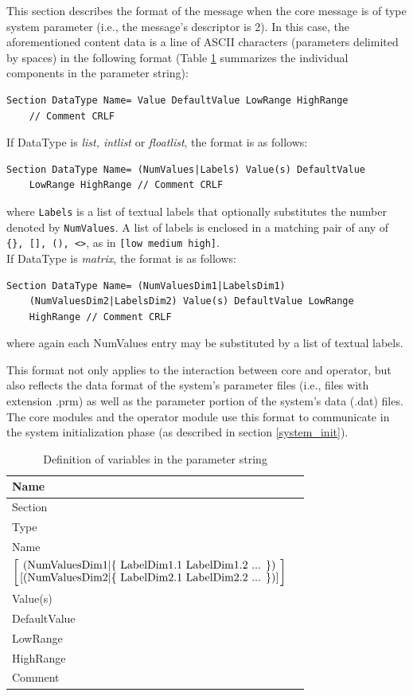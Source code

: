 \documentclass[letterpaper,oneside,12pt]{book}
\begin{document}
This section describes the format of the message when the core message is of 
type system parameter (i.e., the message's descriptor is 2). In this case, the 
aforementioned content data is a line of ASCII characters (parameters delimited 
by spaces) in the following format (Table \ref{tab:parametervariables} summarizes
the individual components in the parameter string):
\begin{verbatim}
Section DataType Name= Value DefaultValue LowRange HighRange
    // Comment CRLF
\end{verbatim}
If DataType is \textit{list, intlist} or \textit{floatlist}, the format is
as follows: 
\begin{verbatim}
Section DataType Name= (NumValues|Labels) Value(s) DefaultValue
    LowRange HighRange // Comment CRLF
\end{verbatim}
where \texttt{Labels} is a list of textual labels that optionally substitutes the number denoted by \texttt{NumValues}. A list of labels is enclosed in a matching pair of any of \verb|{}, [], (), <>|, as in 
\verb|[low medium high]|.
\\[2ex]
If DataType is \textit{matrix}, the format is as follows:
\begin{verbatim}
Section DataType Name= (NumValuesDim1|LabelsDim1)
    (NumValuesDim2|LabelsDim2) Value(s) DefaultValue LowRange
    HighRange // Comment CRLF
\end{verbatim}
where again each NumValues entry may be substituted by a list of textual labels.

This format not only applies to the interaction between core and operator, but
also reflects the data format of the system's parameter files (i.e., files with
extension .prm) as well as the parameter portion of the system's data (.dat) files.
The core modules and the operator module use this format to
communicate in the system initialization phase (as described in section \ref{system_init}).

\begin{table}[ht]
 \centering
 \begin{tabular}{|l|l|}
  \hline
  \textbf{Name} \\
  \hline
  Section \\
  \hline
  Type \\
  \hline
  Name \\
  \hline
  ${\left[
    \mbox{(NumValuesDim1$\mid$\{ LabelDim1.1 LabelDim1.2 ... \})}
    \atop
    \mbox{[(NumValuesDim2$\mid$\{ LabelDim2.1 LabelDim2.2 ... \})]}
    \right]}$ \\
  \hline
  Value(s) \\
  \hline
  DefaultValue \\
  \hline
  LowRange \\
  \hline
  HighRange \\
  \hline
  Comment \\
  \hline
 \end{tabular}
 \caption{Definition of variables in the parameter string}
 \label{tab:parametervariables}
\end{table}   
\end{document}
